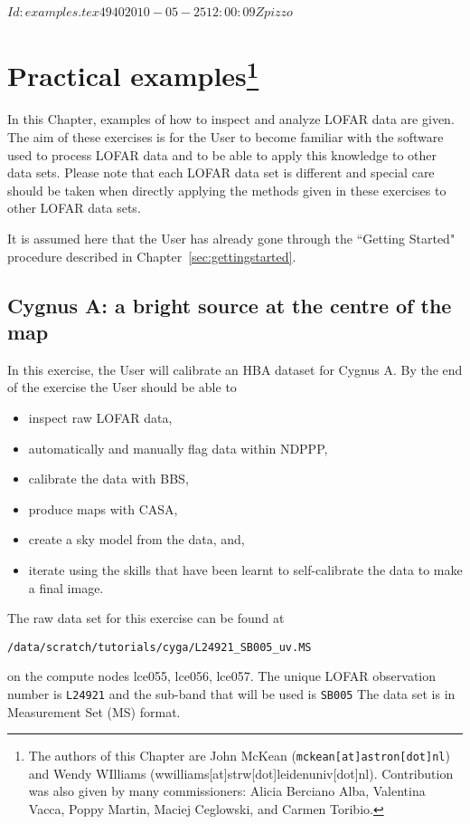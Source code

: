 \svnInfo $Id: examples.tex 4940 2010-05-25 12:00:09Z pizzo $

\section[Practical examples]{Practical examples\footnote{The authors of this Chapter are John McKean ({\tt mckean[at]astron[dot]nl}) and Wendy WIlliams  (wwilliams[at]strw[dot]leidenuniv[dot]nl). Contribution was also given by many commissioners: Alicia Berciano Alba, Valentina Vacca, Poppy Martin, Maciej Ceglowski, and Carmen Toribio.}}
\label{practicalexamples}

In this Chapter, examples of how to inspect and analyze LOFAR data are given. The aim of these exercises is for the User to become familiar with the software used to process LOFAR data and to be able to apply this knowledge to other data sets. Please note that each LOFAR data set is different and special care should be taken when directly applying the methods given in these exercises to other LOFAR data sets.

It is assumed here that the User has already gone through the ``Getting Started" procedure described in Chapter~\ref{sec:gettingstarted}. 

\subsection{Cygnus A: a bright source at the centre of the map}
\label{sec:cyga}

In this exercise, the User will calibrate an HBA dataset for Cygnus A. By the end of the exercise the User should be able to
\begin{itemize}
\item inspect raw LOFAR data,
\item automatically and manually flag data within NDPPP,
\item calibrate the data with BBS,
\item produce maps with CASA,
\item create a sky model from the data, and,
\item iterate using the skills that have been learnt to self-calibrate the data to make a final image.
\end{itemize}


The raw data set for this exercise can be found at
\begin{verbatim}
/data/scratch/tutorials/cyga/L24921_SB005_uv.MS
\end{verbatim}
on the compute nodes lce055, lce056, lce057. The unique LOFAR observation number is \texttt{L24921} and the sub-band that will be used is \texttt{SB005} The data set is in Measurement Set (MS) format.

